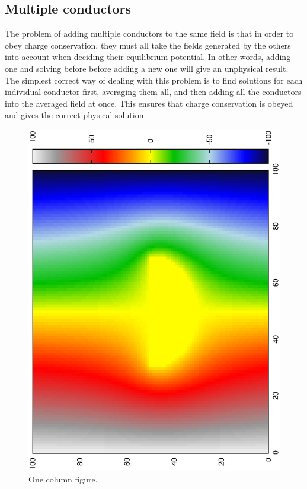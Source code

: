 \documentclass[aps,twocolumn,pre,nofootinbib]{revtex4-1}
\begin{document}
\subsection*{Multiple conductors}
The problem of adding multiple conductors to the same field is that in order to obey charge conservation, they must all take the fields generated by the others into account when deciding their equilibrium potential. In other words, adding one and solving before before adding a new one will give an unphysical result. The simplest correct way of dealing with this problem is to find solutions for each individual conductor first, averaging them all, and then adding all the conductors into the averaged field at once. This ensures that charge conservation is obeyed and gives the correct physical solution.


\begin{figure}
\includegraphics*[width=\breite \columnwidth]{circle.ps} 
\caption{One column figure.
}
\label{fig:Half}
\end{figure}
 
\end{document}
